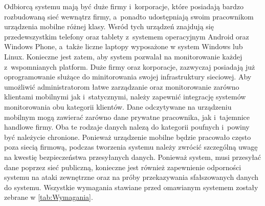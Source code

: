 Odbiorcą systemu mają być duże firmy i~korporacje, które posiadają
bardzo rozbudowaną sieć wewnątrz firmy, a~ponadto udostępniają swoim
pracownikom urządzenia mobilne różnej klasy. Wsród tych urządzeń
znajdują się przedewszystkim telefony oraz tablety z~systemem
operacyjnym Android oraz Windows Phone, a~także liczne laptopy
wyposażone w system Windows lub Linux. Konieczne jest zatem, aby
system pozwalał na monitorowanie każdej z~wspomnianych platform. Duże
firmy oraz korporacje, zazwyczaj posiadają już oprogramowanie służące
do minitorowania swojej infrastruktury sieciowej. Aby umożliwić
administratorom łatwe zarządzanie oraz monitorowanie zarówno klientami
mobilnymi jak i~statycznymi, należy zapewnić integrację systemów
monitorowania obu kategorii klientów. Dane odczytywane na urządzeniu
mobilnym mogą zawierać zarówno dane prywatne pracownika, jak
i~tajemnice handlowe firmy. Oba te rodzaje danych nalezą do kategorii
poufnych i~powiny być należycie chronione. Ponieważ urządzenie mobilne
będzie pracowało często poza siecią firmową, podczas tworzenia systemu
należy zwrócić szczególną uwagę na kwestię bezpieczeństwa przesyłanych
danych. Ponieważ system, musi przesyłać dane poprzez sieć publiczną,
konieczne jest również zapewnienie odporności systemu na ataki
zewnętrzne oraz na próby przekazywania sfałszowanych danych do
systemu. Wszystkie wymagania stawiane przed omawianym systemem zostały
zebrane w \ref{tab:Wymagania}.

